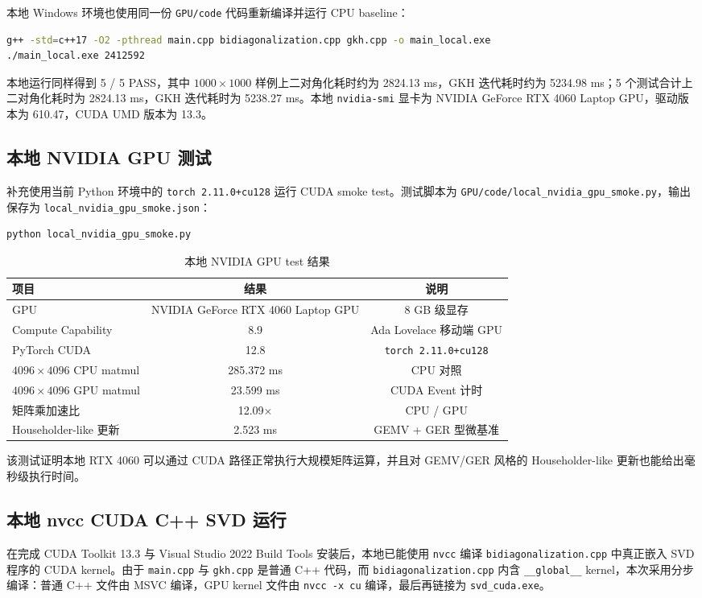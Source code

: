 \documentclass[UTF8,a4paper,10pt]{ctexart}
\begin{document}
本地 Windows 环境也使用同一份 \texttt{GPU/code} 代码重新编译并运行 CPU baseline：
\begin{lstlisting}[language=bash,title=Local CPU run]
g++ -std=c++17 -O2 -pthread main.cpp bidiagonalization.cpp gkh.cpp -o main_local.exe
./main_local.exe 2412592
\end{lstlisting}
本地运行同样得到 5 / 5 PASS，其中 $1000\times1000$ 样例上二对角化耗时约为 2824.13 ms，GKH 迭代耗时约为 5234.98 ms；5 个测试合计上二对角化耗时为 2824.13 ms，GKH 迭代耗时为 5238.27 ms。本地 \texttt{nvidia-smi} 显卡为 NVIDIA GeForce RTX 4060 Laptop GPU，驱动版本为 610.47，CUDA UMD 版本为 13.3。

\subsection{本地 NVIDIA GPU 测试}
补充使用当前 Python 环境中的 \texttt{torch 2.11.0+cu128} 运行 CUDA smoke test。测试脚本为 \texttt{GPU/code/local\_nvidia\_gpu\_smoke.py}，输出保存为 \texttt{local\_nvidia\_gpu\_smoke.json}：
\begin{lstlisting}[language=bash,title=Local NVIDIA GPU  test]
python local_nvidia_gpu_smoke.py
\end{lstlisting}

\begin{table}[H]
\centering
\begin{tabular}{lcc}
\toprule
项目 & 结果 & 说明 \\
\midrule
GPU & NVIDIA GeForce RTX 4060 Laptop GPU & 8 GB 级显存 \\
Compute Capability & 8.9 & Ada Lovelace 移动端 GPU \\
PyTorch CUDA & 12.8 & \texttt{torch 2.11.0+cu128} \\
$4096\times4096$ CPU matmul & 285.372 ms & CPU 对照 \\
$4096\times4096$ GPU matmul & 23.599 ms & CUDA Event 计时 \\
矩阵乘加速比 & 12.09$\times$ & CPU / GPU \\
Householder-like 更新 & 2.523 ms & GEMV + GER 型微基准 \\
\bottomrule
\end{tabular}
\caption{本地 NVIDIA GPU  test 结果}
\end{table}

该测试证明本地 RTX 4060 可以通过 CUDA 路径正常执行大规模矩阵运算，并且对 GEMV/GER 风格的 Householder-like 更新也能给出毫秒级执行时间。

\subsection{本地 nvcc CUDA C++ SVD 运行}
在完成 CUDA Toolkit 13.3 与 Visual Studio 2022 Build Tools 安装后，本地已能使用 \texttt{nvcc} 编译 \texttt{bidiagonalization.cpp} 中真正嵌入 SVD 程序的 CUDA kernel。由于 \texttt{main.cpp} 与 \texttt{gkh.cpp} 是普通 C++ 代码，而 \texttt{bidiagonalization.cpp} 内含 \texttt{\_\_global\_\_} kernel，本次采用分步编译：普通 C++ 文件由 MSVC 编译，GPU kernel 文件由 \texttt{nvcc -x cu} 编译，最后再链接为 \texttt{svd\_cuda.exe}。
\end{document}
